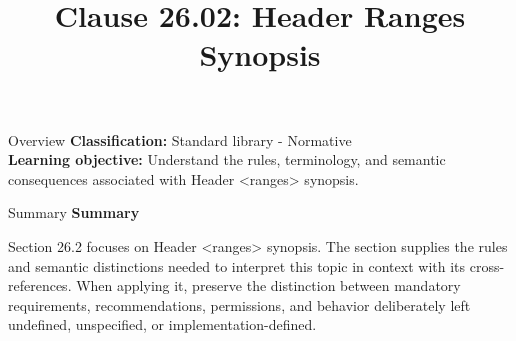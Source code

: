 \documentclass[10pt,letterpaper]{article}
\title{Clause 26.02: Header Ranges Synopsis}
\author{}
\date{}
\begin{document}
\maketitle
\begin{CornellOverviewBox}{Overview}
\textbf{Classification:} Standard library - Normative\\[2pt]
\textbf{Learning objective:} Understand the rules, terminology, and semantic consequences associated with Header <ranges> synopsis.
\end{CornellOverviewBox}\begin{CornellSummaryBox}{Summary}
{\sffamily\bfseries\color{Accent} Summary}\par\vspace{3pt}Section 26.2 focuses on Header <ranges> synopsis. The section supplies the rules and semantic distinctions needed to interpret this topic in context with its cross-references. When applying it, preserve the distinction between mandatory requirements, recommendations, permissions, and behavior deliberately left undefined, unspecified, or implementation-defined.
\end{CornellSummaryBox}
\end{document}

